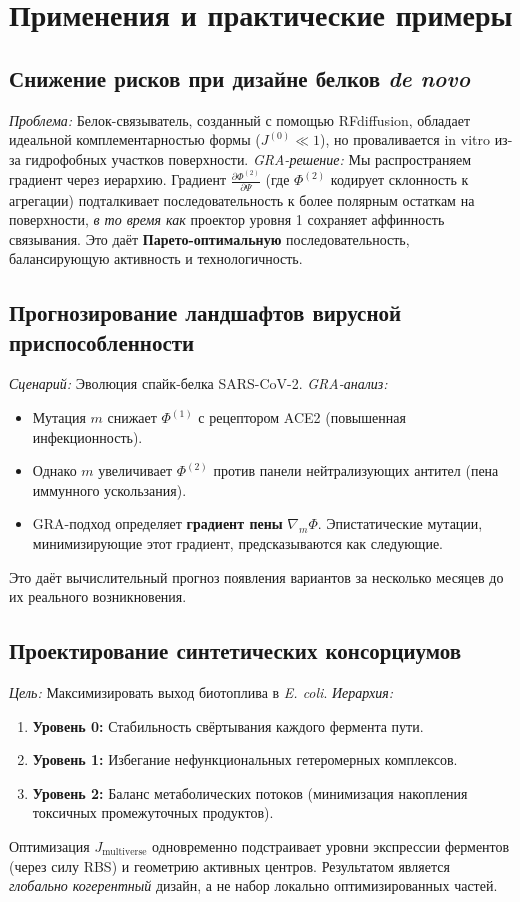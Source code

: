 \documentclass[11pt]{article}
\begin{document}
\section{Применения и практические примеры}

\subsection{Снижение рисков при дизайне белков \textit{de novo}}
\textit{Проблема:} Белок-связыватель, созданный с помощью RFdiffusion, обладает идеальной комплементарностью формы (\(J^{(0)} \ll 1\)), но проваливается in vitro из-за гидрофобных участков поверхности.
\textit{GRA-решение:} Мы распространяем градиент через иерархию. Градиент \(\frac{\partial \Phi^{(2)}}{\partial \Psi}\) (где \(\Phi^{(2)}\) кодирует склонность к агрегации) подталкивает последовательность к более полярным остаткам на поверхности, \emph{в то время как} проектор уровня 1 сохраняет аффинность связывания. Это даёт \textbf{Парето-оптимальную} последовательность, балансирующую активность и технологичность.

\subsection{Прогнозирование ландшафтов вирусной приспособленности}
\textit{Сценарий:} Эволюция спайк-белка SARS-CoV-2.
\textit{GRA-анализ:}
\begin{itemize}
    \item Мутация \(m\) снижает \(\Phi^{(1)}\) с рецептором ACE2 (повышенная инфекционность).
    \item Однако \(m\) увеличивает \(\Phi^{(2)}\) против панели нейтрализующих антител (пена иммунного ускользания).
    \item GRA-подход определяет \textbf{градиент пены} \(\nabla_m \Phi\). Эпистатические мутации, минимизирующие этот градиент, предсказываются как следующие.
\end{itemize}
Это даёт вычислительный прогноз появления вариантов за несколько месяцев до их реального возникновения.

\subsection{Проектирование синтетических консорциумов}
\textit{Цель:} Максимизировать выход биотоплива в \textit{E. coli}.
\textit{Иерархия:}
\begin{enumerate}
    \item \textbf{Уровень 0:} Стабильность свёртывания каждого фермента пути.
    \item \textbf{Уровень 1:} Избегание нефункциональных гетеромерных комплексов.
    \item \textbf{Уровень 2:} Баланс метаболических потоков (минимизация накопления токсичных промежуточных продуктов).
\end{enumerate}
Оптимизация \(J_{\text{multiverse}}\) одновременно подстраивает уровни экспрессии ферментов (через силу RBS) и геометрию активных центров. Результатом является \emph{глобально когерентный} дизайн, а не набор локально оптимизированных частей.
\end{document}
